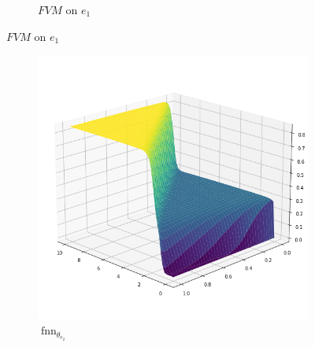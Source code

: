 \begin{figure}[H]
\begin{center}
\begin{subfigure}[b]{0.4\textwidth}
\begin{center}
            \end{center}
            \caption{$FVM$ on $e_1$}
        \end{subfigure}
    \end{center}
\end{figure}
\begin{figure}[H]
    \begin{center}
        \begin{subfigure}[b]{0.4\textwidth}
            \begin{center}
                \includegraphics[scale=0.35]{img/Kante2.png}
            \end{center}
            \caption{$\operatorname{fnn}_{\theta_{e_2}}$}
        \end{subfigure} \hspace{15mm}
        \begin{subfigure}[b]{0.4\textwidth}
            \begin{center}

\end{center}
\end{subfigure}
\end{center}
\end{figure}
